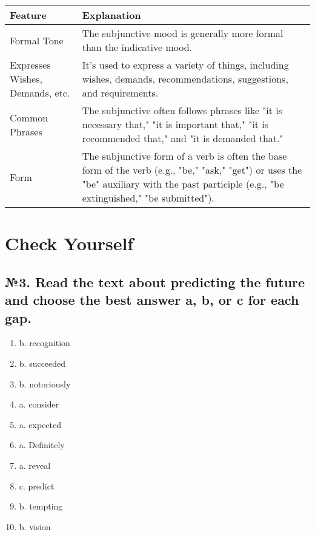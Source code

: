 \renewcommand{\arraystretch}{1.5}
\begin{tabular}{|l|l|}
      \hline
      \textbf{Feature}                & \textbf{Explanation}                                                                                                                                                                        \\ \hline
      Formal Tone                     & The subjunctive mood is generally more formal than the indicative mood.                                                                                                                     \\ \hline
      Expresses Wishes, Demands, etc. & It's used to express a variety of things, including wishes, demands, recommendations, suggestions, and requirements.                                                                        \\ \hline
      Common Phrases                  & The subjunctive often follows phrases like "it is necessary that," "it is important that," "it is recommended that," and "it is demanded that."                                             \\ \hline
      Form                            & The subjunctive form of a verb is often the base form of the verb (e.g., "be," "ask," "get") or uses the "be" auxiliary with the past participle (e.g., "be extinguished," "be submitted"). \\ \hline
\end{tabular}

\section{Check Yourself}

\subsection*{№3. Read the text about predicting the future and choose the best answer a, b, or c for each gap.}

\begin{enumerate}
      \item b. recognition
      \item b. succeeded
      \item b. notoriously
      \item a. consider
      \item a. expected
      \item a. Definitely
      \item a. reveal
      \item c. predict
      \item b. tempting
      \item b. vision
\end{enumerate}

